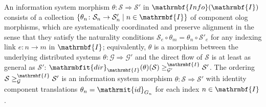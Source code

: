 \documentclass{amsart}
\theoremstyle{remark}
\theoremstyle{definition}
\begin{document}
An information system morphism 
$\theta \colon \mathcal{S} \Rightarrow \mathcal{S}'$
in $\mathrmbf{Info}(\mathrmbf{I})$
consists of a collection 
$\{ \theta_{n} \colon \mathcal{S}_{n} \rightarrow \mathcal{S}'_{n} \mid n \in \mathrmbf{I} \}$
of component olog morphisms,
which are systematically coordinated and preserve alignment
in the sense that they satisfy the naturality conditions
$\mathcal{S}_{e} \circ \theta_{m} = \theta_{n} \circ \mathcal{S}'_{e}$
for any indexing link $e \colon n \rightarrow m$ in $\mathrmbf{I}$;
equivalently,
$\theta$ is a morphism between the underlying distributed systems
$\theta \colon \mathcal{G} \Rightarrow \mathcal{G}'$
and the direct flow of $\mathcal{S}$ is at least as general as $\mathcal{S}'$:
$\mathrmbfit{dir}_{\mathrmbf{I}}(\theta)(\mathcal{S}) \geq^{\mathrmbf{I}}_{\mathcal{G}'} \mathcal{S}'$.
The ordering $\mathcal{S} \geq^{\mathrmbf{I}}_{\mathcal{G}} \mathcal{S}'$
is an information system morphism 
$\theta \colon \mathcal{S} \Rightarrow \mathcal{S}'$
with identity component translations
$\theta_{n} = \mathrmit{id}_{G_{n}}$ for each index $n \in \mathrmbf{I}$.
%
\end{document}
